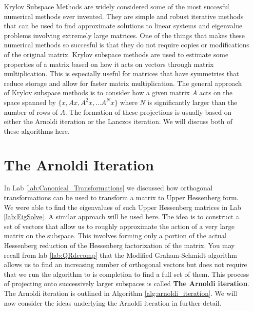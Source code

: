 \label{lab:kry_arnoldi}


Krylov Subspace Methods are widely considered some of the most succesful numerical methods ever invented.
They are simple and robust iterative methods that can be used to find approximate solutions to linear systems and eigenvalue problems involving extremely large matrices.
One of the things that makes these numerical methods so succesful is that they do not require copies or modifications of the original matrix.
Krylov subspace methods are used to estimate some properties of a matrix based on how it acts on vectors through matrix multiplication.
This is especially useful for matrices that have symmetries that reduce storage and allow for faster matrix multiplication.
The general approach of Krylov subspace methods is to consider how a given matrix $A$ acts on the space spanned by $\lbrace x, Ax, A^2 x, ...A^N x \rbrace$ where $N$ is significantly larger than the number of rows of $A$.
The formation of these projections is usually based on either the Arnoldi iteration or the Lanczos iteration.
We will discuss both of these algorithms here.

\section*{The Arnoldi Iteration}

In Lab \ref{lab:Canonical_Transformations} we discussed how orthogonal transformations can be used to transform a matrix to Upper Hessenberg form.
We were able to find the eigenvalues of such Upper Hessenberg matrices in Lab \ref{lab:EigSolve}.
A similar approach will be used here.
The idea is to construct a set of vectors that allow us to roughly approximate the action of a very large matrix on the subspace.
This involves forming only a portion of the actual Hessenberg reduction of the Hessenberg factorization of the matrix.
You may recall from lab \ref{lab:QRdecomp} that the Modified Graham-Schmidt algorithm allows us to find an increasing number of orthogonal vectors but does not require that we run the algorithm to is completion to find a full set of them.
This process of projecting onto successively larger subspaces is called \textbf{The Arnoldi iteration}.
The Arnoldi iteration is outlined in Algorithm \ref{alg:arnoldi_iteration}.
We will now consider the ideas underlying the Arnoldi iteration in further detail.


